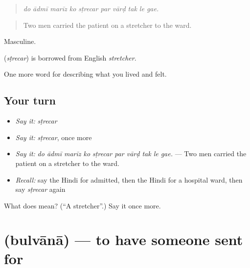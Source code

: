 \begin{quote}
         
\end{quote}

\begin{quote}
\emph{do ādmī marīz ko sṭrecar par vārḍ tak le gae.}
\end{quote}

\begin{quote}
Two men carried the patient on a stretcher to the ward.
\end{quote}

Masculine.

\begin{cousinweb}
\textbf{} (\emph{sṭrecar}) is borrowed from English \emph{stretcher}.
\end{cousinweb}

\begin{grammarlens}[title={What you've built}]
One more word for describing what you lived and felt.
\end{grammarlens}

\subsection*{Your turn}
\begin{itemize}
\raggedright
  \item \emph{Say it:} \emph{sṭrecar}
  \item \emph{Say it:} \emph{sṭrecar}, once more
  \item \emph{Say it:} \emph{do ādmī marīz ko sṭrecar par vārḍ tak le gae.} — Two men carried the patient on a stretcher to the ward.
  \item \emph{Recall:} say the Hindi for admitted, then the Hindi for a hospital ward, then say \emph{sṭrecar} again
\end{itemize}

\begin{tcolorbox}[breakable,colback=teal!4,colframe=teal!35!black,title={Before you move on}]
What does  mean? (\textquotedblleft{}A stretcher\textquotedblright{}.) Say it once more.
\end{tcolorbox}
\section[\texorpdfstring{\hi{बुलवाना} (bulvānā)}{बुलवाना (bulvānā)}]{ (bulvānā) — to have someone sent for}

